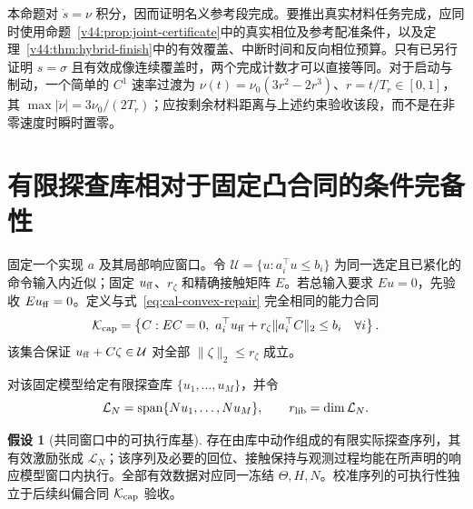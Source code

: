 \documentclass[11pt,a4paper]{article}
\numberwithin{equation}{section}
\theoremstyle{definition}
\newtheorem{assumption}[theorem]{假设}
\begin{document}
本命题对 $\dot s=\nu$ 积分，因而证明名义参考段完成。要推出真实材料任务完成，应同时使用命题~\ref{v44:prop:joint-certificate}中的真实相位及参考配准条件，以及定理~\ref{v44:thm:hybrid-finish}中的有效覆盖、中断时间和反向相位预算。只有已另行证明 $s=\sigma$ 且有效成像连续覆盖时，两个完成计数才可以直接等同。对于启动与制动，一个简单的 $C^1$ 速率过渡为 $\nu(t)=\nu_0(3r^2-2r^3)$、$r=t/T_r\in[0,1]$，其 $\max|\dot\nu|=3\nu_0/(2T_r)$；应按剩余材料距离与上述约束验收该段，而不是在非零速度时瞬时置零。





\section{有限探查库相对于固定凸合同的条件完备性}
\label{sec:cal-finite}

固定一个实现 $a$ 及其局部响应窗口。令 $\mathcal U=\{u:a_i^\top u\le b_i\}$ 为同一选定且已紧化的命令输入内近似；固定 $u_{\rm ff}$、$r_\zeta$ 和精确接触矩阵 $E$。若总输入要求 $Eu=0$，先验收 $Eu_{\rm ff}=0$。定义与式~\eqref{eq:cal-convex-repair} 完全相同的能力合同
\begin{equation}
 \mathcal K_{\rm cap}=
 \left\{
 C:
 EC=0,\ 
 a_i^\top u_{\rm ff}
 +r_\zeta\|a_i^\top C\|_2\le b_i
 \quad\forall i
 \right\}.
 \label{rev:eq:same-convex-contract}
\end{equation}
该集合保证 $u_{\rm ff}+C\zeta\in\mathcal U$ 对全部
$\|\zeta\|_2\le r_\zeta$ 成立。

对该固定模型给定有限探查库
$\{u_1,\ldots,u_M\}$，并令
\begin{equation}
 \mathcal L_N=
 \operatorname{span}\{Nu_1,\ldots,Nu_M\},
 \qquad
 r_{\rm lib}=\dim\mathcal L_N .
 \label{rev:eq:library-space}
\end{equation}

\begin{assumption}[共同窗口中的可执行库基]
\label{rev:ass:executable-library}
存在由库中动作组成的有限实际探查序列，其有效激励张成 $\mathcal L_N$；该序列及必要的回位、接触保持与观测过程均能在所声明的响应模型窗口内执行。全部有效数据对应同一冻结 $\Theta,H,N$。校准序列的可执行性独立于后续纠偏合同 $\mathcal K_{\rm cap}$ 验收。
\end{assumption}
\end{document}
